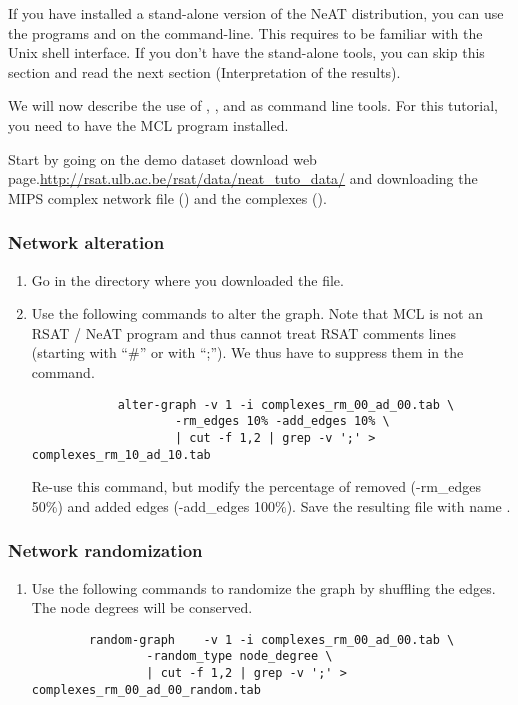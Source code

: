 If you have installed a stand-alone version of the NeAT distribution,
you can use the programs  and  on the
command-line. This requires to be familiar with the Unix shell
interface. If you don't have the stand-alone tools, you can skip this
section and read the next section (Interpretation of the results).

We will now describe the use of , ,   and  as command line tools. For this tutorial, you need to have the MCL program installed. 

Start by going on the demo dataset download web page.\url{http://rsat.ulb.ac.be/rsat/data/neat\_tuto\_data/} and downloading the MIPS complex network file () and the complexes ().


\subsubsection{Network alteration}

\begin{enumerate}

\item Go in the directory where you downloaded the file.
\item Use the following commands to alter the graph. Note that MCL is not an RSAT / NeAT program and thus cannot treat RSAT comments lines (starting with ``\#'' or with ``;''). We thus have to suppress them in the command.
{\color{Blue} \begin{footnotesize} 
		\begin{verbatim}
			alter-graph	-v 1 -i complexes_rm_00_ad_00.tab \
					-rm_edges 10% -add_edges 10% \
					| cut -f 1,2 | grep -v ';' > complexes_rm_10_ad_10.tab
		\end{verbatim} \end{footnotesize}
	}
Re-use this command, but modify the percentage of removed (-rm\_edges 50\%) and added edges (-add\_edges 100\%). Save the resulting file with name .
\end{enumerate}
\subsubsection{Network randomization}
\begin{enumerate}
\item Use the following commands to randomize the graph by shuffling the edges. The node degrees will be conserved.
{\color{Blue} \begin{footnotesize} 
		\begin{verbatim}
		random-graph 	-v 1 -i complexes_rm_00_ad_00.tab \
				-random_type node_degree \
				| cut -f 1,2 | grep -v ';' > complexes_rm_00_ad_00_random.tab
		\end{verbatim} \end{footnotesize}
	}
\end{enumerate}
